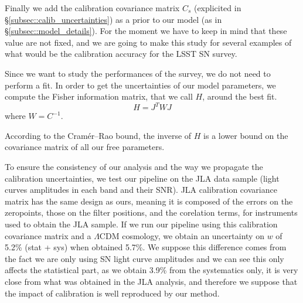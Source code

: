 \documentclass[\docopts]{\docclass}
\begin{document}
Finally we add the calibration covariance matrix $C_s$ (explicited in §\ref{subsec::calib_uncertainties}) as a prior to our model (as in §\ref{subsec::model_details}).
For the moment we have to keep in mind that these value are not fixed, and we are going to make this study for several examples of what would be the calibration accuracy for the LSST SN survey.

Since we want to study the performances of the survey, we do not need to perform a fit.
In order to get the uncertainties of our model parameters, we compute the Fisher information matrix, that we call $H$, around the best fit.
\begin{equation}
H = J^TWJ
\end{equation}
where $W = C^{-1}$.

According to the Cramér–Rao bound, the inverse of $H$ is a lower bound on the covariance matrix of all our free parameters.

To ensure the consistency of our analysis and the way we propagate the calibration uncertainties, we test our pipeline on the JLA data sample (light curves amplitudes in each band and their SNR).
JLA calibration covariance matrix has the same design as ours, meaning it is composed of the errors on the zeropoints, those on the filter positions, and the corelation terms, for instruments used to obtain the JLA sample.
If we run our pipeline using this calibration covariance matrix and a $\Lambda\text{CDM}$ cosmology, we obtain an uncertainty on $w$ of 5.2\% (stat + sys) when \cite{1401.4064} obtained 5.7\%.
We suppose this difference comes from the fact we are only using SN light curve amplitudes and we can see this only affects the statistical part, as we obtain 3.9\% from the systematics only, it is very close from what was obtained in the JLA analysis, and therefore we suppose that the impact of calibration is well reproduced by our method.

\end{document}
